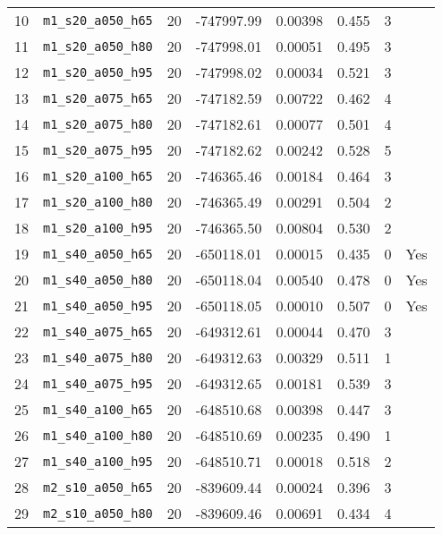 \begin{table}[ht]
\begin{tabular}{cccccccc}
    10 & \verb|m1_s20_a050_h65| &       20 & -747997.99 &  0.00398 &     0.455 &      3      \\
    11 & \verb|m1_s20_a050_h80| &       20 & -747998.01 &  0.00051 &     0.495 &      3      \\
    12 & \verb|m1_s20_a050_h95| &       20 & -747998.02 &  0.00034 &     0.521 &      3      \\
    13 & \verb|m1_s20_a075_h65| &       20 & -747182.59 &  0.00722 &     0.462 &      4      \\
    14 & \verb|m1_s20_a075_h80| &       20 & -747182.61 &  0.00077 &     0.501 &      4      \\
    15 & \verb|m1_s20_a075_h95| &       20 & -747182.62 &  0.00242 &     0.528 &      5      \\
    16 & \verb|m1_s20_a100_h65| &       20 & -746365.46 &  0.00184 &     0.464 &      3      \\
    17 & \verb|m1_s20_a100_h80| &       20 & -746365.49 &  0.00291 &     0.504 &      2      \\
    18 & \verb|m1_s20_a100_h95| &       20 & -746365.50 &  0.00804 &     0.530 &      2      \\
    19 & \verb|m1_s40_a050_h65| &       20 & -650118.01 &  0.00015 &     0.435 &      0 & Yes\\
    20 & \verb|m1_s40_a050_h80| &       20 & -650118.04 &  0.00540 &     0.478 &      0 & Yes\\
    21 & \verb|m1_s40_a050_h95| &       20 & -650118.05 &  0.00010 &     0.507 &      0 & Yes\\
    22 & \verb|m1_s40_a075_h65| &       20 & -649312.61 &  0.00044 &     0.470 &      3      \\
    23 & \verb|m1_s40_a075_h80| &       20 & -649312.63 &  0.00329 &     0.511 &      1      \\
    24 & \verb|m1_s40_a075_h95| &       20 & -649312.65 &  0.00181 &     0.539 &      3      \\
    25 & \verb|m1_s40_a100_h65| &       20 & -648510.68 &  0.00398 &     0.447 &      3      \\
    26 & \verb|m1_s40_a100_h80| &       20 & -648510.69 &  0.00235 &     0.490 &      1      \\
    27 & \verb|m1_s40_a100_h95| &       20 & -648510.71 &  0.00018 &     0.518 &      2      \\
    28 & \verb|m2_s10_a050_h65| &       20 & -839609.44 &  0.00024 &     0.396 &      3      \\
    29 & \verb|m2_s10_a050_h80| &       20 & -839609.46 &  0.00691 &     0.434 &      4      \\

\end{tabular}
\end{table}
